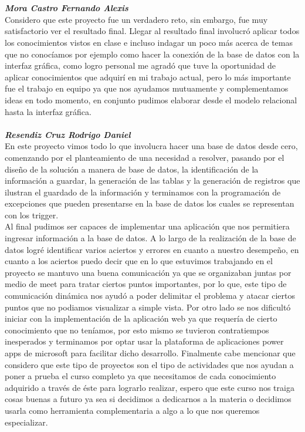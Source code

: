 \documentclass[letter,12pt]{article} %
\begin{document}
\\\\\textbf{\textit{Mora Castro Fernando Alexis}}
\\
Considero que este proyecto fue un verdadero reto, sin embargo, fue muy satisfactorio ver el resultado final. Llegar al resultado final involucró aplicar todos los conocimientos vistos en clase e incluso indagar un poco más acerca de temas que no conocíamos por ejemplo como hacer la conexión de la base de datos con la interfaz gráfica, como logro personal me agradó que tuve la oportunidad de aplicar conocimientos que adquirí en mi trabajo actual, pero lo más importante fue el trabajo en equipo ya que nos ayudamos mutuamente y complementamos ideas en todo momento, en conjunto pudimos elaborar desde el modelo relacional hasta la interfaz gráfica.
\\\\\textbf{\textit{Resendiz Cruz Rodrigo Daniel}}
\\
En este proyecto vimos todo lo que involucra hacer una base de datos desde cero, comenzando por el planteamiento de una necesidad a resolver, pasando por el diseño de la solución a manera de base de datos, la identificación de la información a guardar, la generación de las tablas y la generación de registros que ilustran el guardado de la información y terminamos con la programación de excepciones que pueden presentarse en la base de datos los cuales se representan con los trigger. \\
Al final pudimos ser capaces de implementar una aplicación que nos permitiera ingresar información a la base de datos.
A lo largo de la realización de la base de datos logré identificar varios aciertos y errores en cuanto a nuestro desempeño, en cuanto a los aciertos puedo decir que en lo que estuvimos trabajando en el proyecto se mantuvo una buena comunicación ya que se organizaban juntas por medio de meet para tratar ciertos puntos importantes, por lo que, este tipo de comunicación dinámica nos ayudó a poder delimitar el problema y atacar ciertos puntos que no podiamos visualizar a simple vista. Por otro lado se nos dificultó iniciar con la implementación de la aplicación web ya que requería de cierto conocimiento que no teníamos, por esto mismo se tuvieron contratiempos inesperados y terminamos por optar usar la plataforma de aplicaciones power apps de microsoft para facilitar dicho desarrollo. Finalmente cabe mencionar que considero que este tipo de proyectos son el tipo de actividades que nos ayudan a poner a prueba el curso completo ya que necesitamos de cada conocimiento adquirido a través de éste para lograrlo realizar, espero que este curso nos traiga cosas buenas a futuro ya sea si decidimos a dedicarnos a la materia o decidimos usarla como herramienta complementaria a algo a lo que nos queremos especializar.
\end{document}

